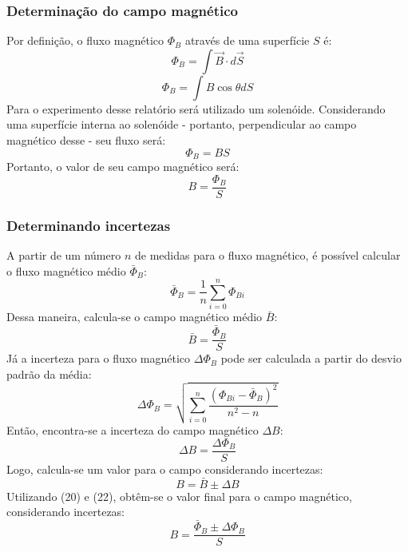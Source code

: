 \documentclass[column,brazilian,12pt,a4paper,final]{article}
\begin{document}
      \subsubsection{Determinação do campo magnético}
        Por definição, o fluxo magnético $\Phi_B$ através de uma 
        superfície $S$ é:
        \begin{equation}
          \Phi_B = \int \vec{B} \cdot d\vec{S} 
        \end{equation}
        \begin{equation}
          \Phi_B = \int B \cos{\theta} dS 
        \end{equation}
        Para o experimento desse relatório será utilizado um solenóide. 
        Considerando uma superfície interna ao solenóide - portanto, 
        perpendicular ao campo magnético desse - seu fluxo será:
        \begin{equation}
          \Phi_B = BS
        \end{equation}
        Portanto, o valor de seu campo magnético será:
        \begin{equation}
          B = \frac{\Phi_B}{S}
        \end{equation}
      \subsubsection{Determinando incertezas}
        A partir de um número $n$ de medidas para o fluxo magnético, é possível
        calcular o fluxo magnético médio $\bar{\Phi}_B$:
        \begin{equation}
          \bar{\Phi}_B = \frac{1}{n} \sum_{i=0}^n \Phi_{Bi}
        \end{equation}
        Dessa maneira, calcula-se o campo magnético médio $\bar{B}$:
        \begin{equation}
          \bar{B} = \frac{\bar{\Phi}_B}{S}
        \end{equation}
        Já a incerteza para o fluxo magnético $\Delta \Phi_B$ pode ser 
        calculada 
        a partir do desvio padrão da média:
        \begin{equation}
          \Delta \Phi_B = \sqrt{\sum_{i=0}^n 
          \frac{(\Phi_{Bi} - \bar{\Phi}_B)^2}{{n^2 - n}}}
        \end{equation} 
        Então, encontra-se a incerteza do campo magnético $\Delta B$:
        \begin{equation}
          \Delta B = \frac{\Delta \Phi_B}{S}
        \end{equation}
        Logo, calcula-se um valor para o campo considerando incertezas:
        \begin{equation}
          B = \bar{B} \pm \Delta B 
        \end{equation}
        Utilizando (20) e (22), obtêm-se o valor final para o campo 
        magnético, considerando incertezas:
        \begin{equation}
          B = \frac{\bar{\Phi}_B \pm \Delta \Phi_B}{S}
        \end{equation}
\end{document}
